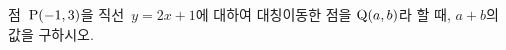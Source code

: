 점~$\mathrm{P}(-1{,}\mkern3mu\mathopen{}3)$을 직선~$y=2x+1$에 대하여 대칭이동한 점을 $\mathrm{Q}(a{,}\mkern3mu\mathopen{}b)$라 할 때, $a+b$의 값을 구하시오.
